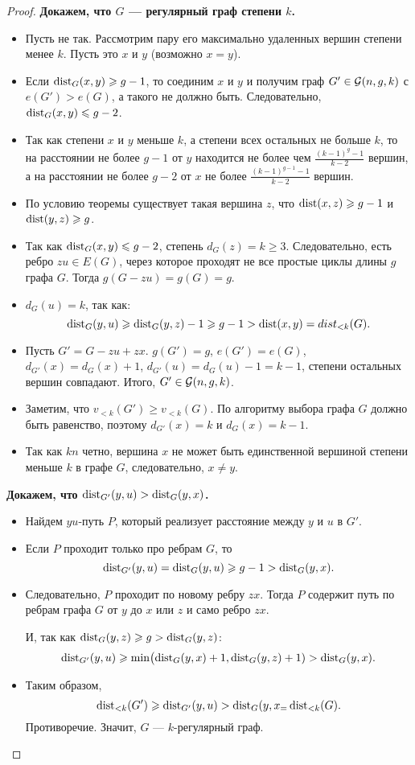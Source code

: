 \begin{proof}
		{\bf Докажем, что $G$ --- регулярный граф степени $k$.}
		\begin{itemize}
			\item Пусть не так. Рассмотрим пару его максимально удаленных вершин степени менее $k$. Пусть это $x$ и  $y$ (возможно $x = y$).
			\item Если $\operatorname{dist}_G(x, y) \geqslant g-1$, то соединим $x$ и $y$ и получим граф $G' \in \mathcal{G}(n, g, k)$  с $e(G') > e(G)$, а такого не должно быть.
				Следовательно, $\operatorname{dist}_{G}(x, y) \leqslant g-2$.
			\item Так как степени $x$ и $y$ меньше $k$, а степени всех остальных не больше $k$, то на расстоянии не более $g-1$ от $y$ находится не более чем $\frac{(k-1)^{g}-1}{k-2}$ вершин, а на расстоянии не более $g-2$ от $x$ не более $\frac{(k-1)^{g-1}-1}{k-2}$ вершин.
			\item По условию теоремы существует такая вершина $z$, что $\operatorname{dist}(x, z) \geqslant g-1$ и $\operatorname{dist}(y,z) \geqslant g$. %
			\item Так как $\operatorname{dist}_{G}(x, y) \leqslant g-2$, степень $d_G(z) = k \ge 3$. Следовательно, есть ребро $zu \in  E(G)$, через которое проходят не все простые циклы длины $g$ графа $G$. Тогда $g(G-zu) = g(G) = g$. %
			\item $d_G(u) = k$, так как:
				 \[
				\operatorname{dist}_G(y, u) \geqslant \operatorname{dist}_G(y, z) -1 \geqslant g-1 > \operatorname{dist}(x,y) = dist_{<k}(G)
				.\] 
			\item Пусть $G' = G - zu + zx$.  $g(G') = g$, $e(G') = e(G)$, $d_{G'}(x) = d_{G}(x) + 1$, $d_{G'}(u) = d_{G}(u) -1 = k-1$, степени остальных вершин совпадают. Итого, $G' \in \mathcal{G}(n, g, k)$.
			\item Заметим, что $v_{<k}(G') \ge v_{<k}(G)$. По алгоритму выбора графа $G$ должно быть равенство, поэтому $d_{G'}(x) = k$ и $d_G(x) = k-1$.
			\item Так как $kn$ четно, вершина $x$ не может быть единственной вершиной степени меньше $k$ в графе $G$, следовательно, $x \neq  y$.
		\end{itemize}
		{\bf Докажем, что $\operatorname{dist}_{G'}(y,u) > \operatorname{dist}_{G}(y,x)$.}
		\begin{itemize}
			\item Найдем $yu$-путь  $P$, который реализует расстояние между $y$ и $u$ в $G'$.
			\item Если $P$ проходит  только про ребрам $G$, то
				\[
				\operatorname{dist}_{G'}(y,u) = \operatorname{dist}_G(y,u) \geqslant g-1 > \operatorname{dist}_G(y,x)
				.\] 
			\item Следовательно, $P$ проходит по новому ребру $zx$. Тогда $P$ содержит путь по ребрам графа $G$ от $y$ до  $x$ или $z$ и само ребро $zx$. 

				И, так как $\operatorname{dist}_G(y,z) \geqslant g > \operatorname{dist}_G(y,z)$:
				\[
				\operatorname{dist}_{G'}(y,u) \geqslant \min\bigl( \operatorname{dist}_G(y, x) + 1, \operatorname{dist}_G(y,z) +1) > \operatorname{dist}_G(y,x)
				.\] 
			\item Таким образом,
				\[
				\operatorname{dist}_{<k}(G') \geqslant \operatorname{dist}_{G'}(y,u) > \operatorname{dist}_G(y,x_ = \operatorname{dist}_{<k}(G)
				.\] 
				Противоречие. Значит, $G$ --- $k$-регулярный граф.
		\end{itemize}
\end{proof}
